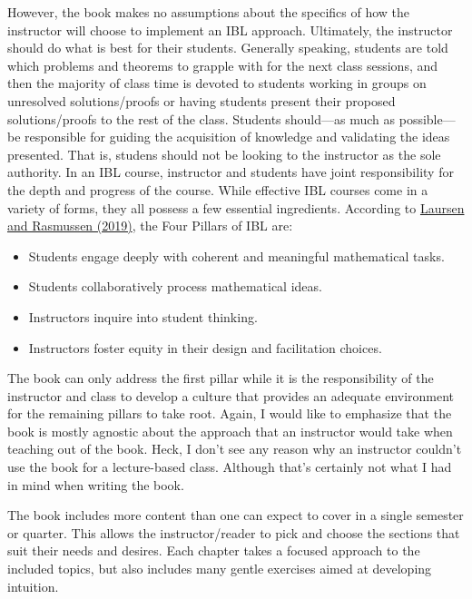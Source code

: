 \documentclass[11pt]{article}%
\newcommand{\blankline}{\pagebreak[2]\vspace{.5\baselineskip}}
\begin{document}
\blankline

However, the book makes no assumptions about the specifics of how the instructor will choose to implement an IBL approach. Ultimately, the instructor should do what is best for their students. Generally speaking, students are told which problems and theorems to grapple with for the next class sessions, and then the majority of class time is devoted to students working in groups on unresolved solutions/proofs or having students present their proposed solutions/proofs to the rest of the class. Students should---as much as possible---be responsible for guiding the acquisition of knowledge and validating the ideas presented. That is, studens should not be looking to the instructor as the sole authority. In an IBL course, instructor and students have joint responsibility for the depth and progress of the course. While effective IBL courses come in a variety of forms, they all possess a few essential ingredients. According to \href{https://www.colorado.edu/eer/sites/default/files/attached-files/laursenrasmussencommentaryauthorversion0219.pdf}{Laursen and Rasmussen (2019)}, the Four Pillars of IBL are:
\begin{itemize}
\item Students engage deeply with coherent and meaningful mathematical tasks.
\item Students collaboratively process mathematical ideas.
\item Instructors inquire into student thinking.
\item Instructors foster equity in their design and facilitation choices.
\end{itemize}
The book can only address the first pillar while it is the responsibility of the instructor and class to develop a culture that provides an adequate environment for the remaining pillars to take root. Again, I would like to emphasize that the book is mostly agnostic about the approach that an instructor would take when teaching out of the book.  Heck, I don't see any reason why an instructor couldn't use the book for a lecture-based class. Although that's certainly not what I had in mind when writing the book.

\blankline

The book includes more content than one can expect to cover in a single semester or quarter. This allows the instructor/reader to pick and choose the sections that suit their needs and desires. Each chapter takes a focused approach to the included topics, but also includes many gentle exercises aimed at developing intuition.
\end{document}

